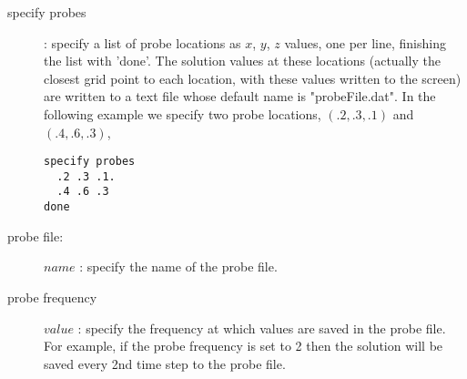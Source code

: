 \documentclass[10pt]{article}
\begin{document}
\begin{description}
  \item [\qquad specify probes] : specify a list of probe locations as $x$, $y$, $z$ values, one per line, finishing the
         list with 'done'. The solution values at these locations (actually the closest grid point to each location, with these
         values written to the screen) are
    written to a text file whose default name is "probeFile.dat". 
    In the following example we specify two probe locations, $(.2,.3,.1)$ and $(.4,.6,.3)$, 
\begin{verbatim}
specify probes
  .2 .3 .1.
  .4 .6 .3
done
\end{verbatim}
  \item [\qquad probe file:] $name$ : specify the name of the probe file.
  \item [\qquad probe frequency] $value$ : specify the frequency at which values are saved in the probe file. For example,
      if the probe frequency is set to 2 then the solution will be saved every 2nd time step to the probe file. 
\end{description}


\clearpage



\clearpage





\printindex
\end{document}
